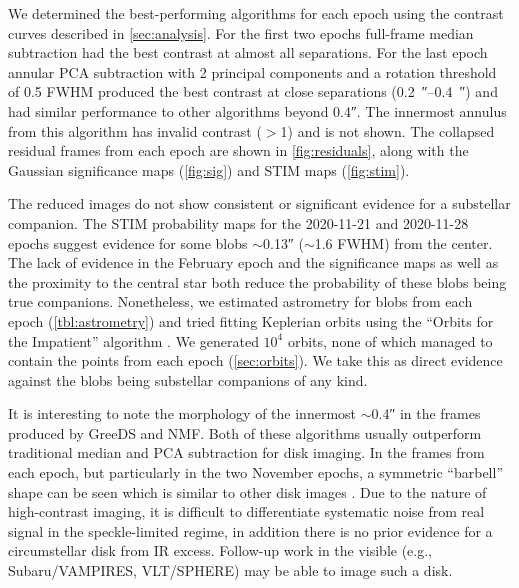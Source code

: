 \documentclass[twocolumn]{aastex631}
\begin{document}
We determined the best-performing algorithms for each epoch using the contrast curves described in \autoref{sec:analysis}. For the first two epochs full-frame median subtraction had the best contrast at almost all separations. For the last epoch annular PCA subtraction with 2 principal components and a rotation threshold of 0.5 FWHM produced the best contrast at close separations (\qtyrange{0.2}{0.4}{\arcsecond}) and had similar performance to other algorithms beyond \ang{;;0.4}. The innermost annulus from this algorithm has invalid contrast ($>$1) and is not shown. The collapsed residual frames from each epoch are shown in \autoref{fig:residuals}, along with the Gaussian significance maps (\autoref{fig:sig}) and STIM maps (\autoref{fig:stim}).

The reduced images do not show consistent or significant evidence for a substellar companion. The STIM probability maps for the 2020-11-21 and 2020-11-28 epochs suggest evidence for some blobs $\sim$\ang{;;0.13} ($\sim$1.6 FWHM) from the center. The lack of evidence in the February epoch and the significance maps as well as the proximity to the central star both reduce the probability of these blobs being true companions. Nonetheless, we estimated astrometry for blobs from each epoch (\autoref{tbl:astrometry}) and tried fitting Keplerian orbits using the ``Orbits for the Impatient'' algorithm \citep[OFTI;][]{blunt_orbits_2017}. We generated $10^4$ orbits, none of which managed to contain the points from each epoch (\autoref{sec:orbits}). We take this as direct evidence against the blobs being substellar companions of any kind.

It is interesting to note the morphology of the innermost $\sim$\ang{;;0.4} in the frames produced by GreeDS and NMF. Both of these algorithms usually outperform traditional median and PCA subtraction for disk imaging. In the frames from each epoch, but particularly in the two November epochs, a symmetric ``barbell'' shape can be seen which is similar to other disk images \citep[e.g., fig.~7][]{norris_vampires_2014}. Due to the nature of high-contrast imaging, it is difficult to differentiate systematic noise from real signal in the speckle-limited regime, in addition there is no prior evidence for a circumstellar disk from IR excess. Follow-up work in the visible (e.g., Subaru/VAMPIRES, VLT/SPHERE) may be able to image such a disk.
\end{document}
